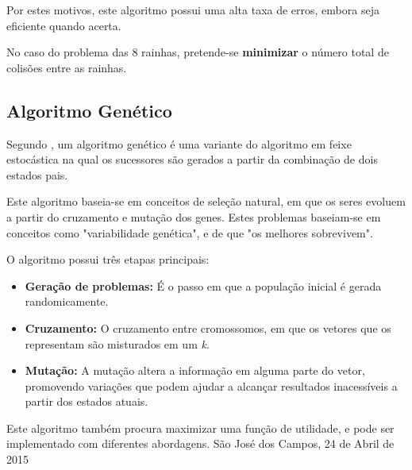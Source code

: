 \documentclass[conference]{IEEEtran}
\begin{document}
	Por estes motivos, este algoritmo possui uma alta taxa de erros, embora seja eficiente quando acerta.
	
	No caso do problema das 8 rainhas, pretende-se \textbf{minimizar} o número total de colisões entre as rainhas.
	
	
	\subsection{Algoritmo Genético}
	Segundo \cite{norvig2014inteligencia}, um algoritmo genético é uma variante do algoritmo em feixe estocástica
	na qual os sucessores são gerados a partir da combinação de dois estados pais.
	
	Este algoritmo baseia-se em conceitos de seleção natural, em que os seres evoluem a partir do cruzamento e mutação
	dos genes. Estes problemas baseiam-se em conceitos como "variabilidade genética", e de que "os melhores sobrevivem".
	
	O algoritmo possui três etapas principais:
	\begin{itemize}
		\item \textbf{Geração de problemas: } É o passo em que a população inicial é gerada randomicamente. 
		\item \textbf{Cruzamento: } O cruzamento entre cromossomos, em que os vetores que os representam são misturados em um \textit{k}.
		\item \textbf{Mutação: } A mutação altera a informação em alguma parte do vetor, promovendo variações que podem ajudar a alcançar resultados inacessíveis a partir dos estados atuais.
	\end{itemize}
	
	Este algoritmo também procura maximizar uma função de utilidade, e pode ser implementado com diferentes abordagens.
	\hfill São José dos Campos, 24 de Abril de 2015
	
	
	
\end{document}
